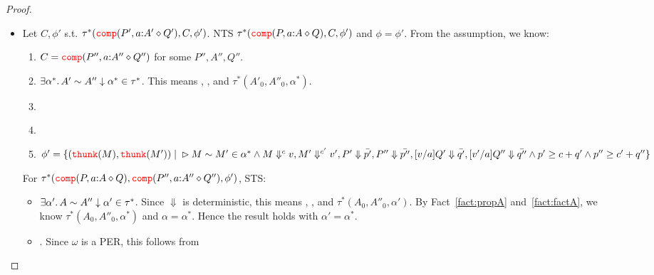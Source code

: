 \begin{proof}
\begin{enumerate}
\begin{itemize}
\begin{itemize}
\begin{itemize}
             Let $\alpha(v,v')$. Suffices to show that 
             , , and $\omega(u,u')$ for some $u,u'$. 
             By Fact~\ref{fact:qeq}, we know , 
             , and $\omega(Q_{v'}, Q'_v)$. Thus suffices to take 
             $u = Q_{v'}, u' = Q'_v$.
        \end{itemize}
      \item Let $C, \phi'$ s.t. $\tau^*({\color{red}{\mathtt{comp}}}(P', a {:} A' \diamond Q'),C,\phi')$. NTS
        $\tau^*({\color{red}{\mathtt{comp}}}(P, a {:} A \diamond Q),C,\phi')$ and $\phi = \phi'$.
        From the assumption, we know:
        \begin{enumerate}
          \item $C = {\color{red}{\mathtt{comp}}}(P'', a {:} A'' \diamond Q'')$ for some $P'',A'',Q''$.
          \item $\exists \alpha^*.\, A' \sim A'' \downarrow \alpha^* \in \tau^*$. This means  
            , , and $\tau^*(A'_0,A''_0,\alpha^*)$. 
            \label{fact:factA}
          \item {} \label{fact:peq1}
          \item {} \label{fact:qeq1}
          \item $\phi' = \{({\color{red}{\mathtt{thunk}}}(M), {\color{red}{\mathtt{thunk}}}(M')) \mid \\
   \rhd M \sim M' \in \alpha^*\\
  \land M \Downarrow^{c} v, M' \Downarrow^{c'} v', P' \Downarrow \bar{p'},  
    P'' \Downarrow \bar{p''}, [v/a]Q' \Downarrow \bar{q'}, [v'/a]Q'' \Downarrow \bar{q''}\\
  \land p' \ge c + q' \land p'' \ge c' + q''\\
            \}$ \label{fact:phiprime}
        \end{enumerate}
        For $\tau^*({\color{red}{\mathtt{comp}}}(P, a {:} A \diamond Q), {\color{red}{\mathtt{comp}}}(P'', a {:} A'' \diamond Q''),\phi')$, 
        STS:
        \begin{itemize}
          \item $\exists \alpha'.\, A \sim A'' \downarrow \alpha' \in \tau^*$. 
            Since $\Downarrow$ is deterministic, this means  
            , , and $\tau^*(A_0,A''_0,\alpha')$.
            By Fact~\ref{fact:propA} and~\ref{fact:factA}, we know 
            $\tau^*(A_0,A''_0,\alpha^*)$ and $\alpha = \alpha^*$.
            Hence the result holds with $\alpha' = \alpha^*$.
          \item {}. Since $\omega$ is a PER, this follows from

\end{itemize}
\end{itemize}
\end{itemize}
\end{enumerate}
\end{proof}
